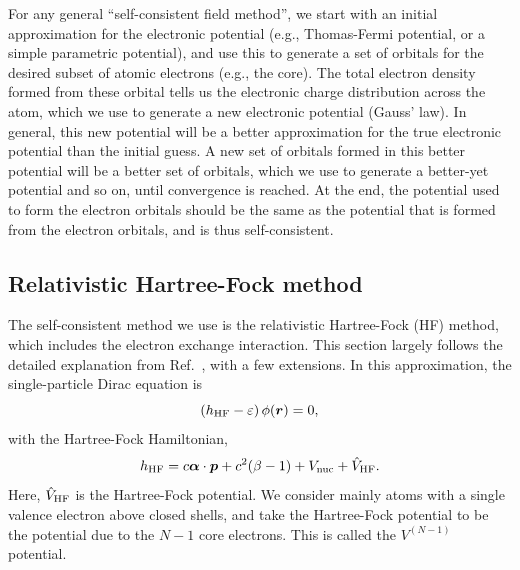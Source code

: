 \documentclass[10pt,twocolumn,a4paper]{article}%
\renewcommand{\v}[1]{\ensuremath{\boldsymbol{#1}}}		%
\newcommand{\be}{\begin{equation}}
\newcommand{\ee}{\end{equation}}
\def\en{\ensuremath{\varepsilon}}
\begin{document}
For any general ``self-consistent field method'', we start with an initial approximation for the electronic potential (e.g., Thomas-Fermi potential, or a simple parametric potential), and use this to generate a set of orbitals for the desired subset of atomic electrons (e.g., the core).
The total electron density formed from these orbital tells us the electronic charge distribution across the atom, which we use to generate a new electronic potential (Gauss' law).
In general, this new potential will be a better approximation for the true electronic potential than the initial guess.
A new set of orbitals formed in this better potential will be a better set of orbitals, which we use to generate a better-yet potential and so on, until convergence is reached.
At the end, the potential used to form the electron orbitals should be the same as the potential that is formed from the electron orbitals, and is thus self-consistent.

\subsection{Relativistic Hartree-Fock method}

The self-consistent method we use is the relativistic Hartree-Fock (HF) method, which includes the electron exchange interaction.
This section largely follows the detailed explanation from Ref.~\cite{JohnsonBook2007}, with a few extensions.
In this approximation, the single-particle Dirac equation is
\be\label{eq:HF}
\left(h_{\rm HF} - \en\right) \phi(\v{r}) = 0,
\ee
with the Hartree-Fock Hamiltonian,
\be\label{eq:H-HF}
h_{\rm HF}  = c \v{\alpha}\cdot\v{p} + c^2(\beta-1) +  V_{\rm nuc} +  \hat V_{\rm HF}.
\ee
Here, $\hat V_{\rm HF}$ is the Hartree-Fock potential.
We consider mainly atoms with a single valence electron above closed shells, and take the Hartree-Fock potential to be the potential due to the $N-1$ core electrons.
This is called the $V^{(N-1)}$ potential. 
\end{document}
